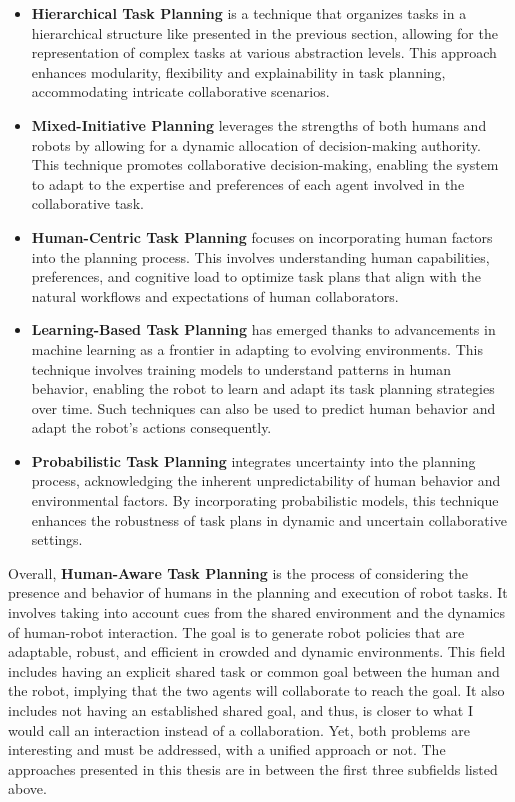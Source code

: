\begin{itemize}
    \item \textbf{Hierarchical Task Planning} is a technique that organizes tasks in a hierarchical structure like presented in the previous section, allowing for the representation of complex tasks at various abstraction levels. This approach enhances modularity, flexibility and explainability in task planning, accommodating intricate collaborative scenarios.
    
    \item \textbf{Mixed-Initiative Planning} leverages the strengths of both humans and robots by allowing for a dynamic allocation of decision-making authority. This technique promotes collaborative decision-making, enabling the system to adapt to the expertise and preferences of each agent involved in the collaborative task.
    
    \item \textbf{Human-Centric Task Planning} focuses on incorporating human factors into the planning process. This involves understanding human capabilities, preferences, and cognitive load to optimize task plans that align with the natural workflows and expectations of human collaborators.
    
    \item \textbf{Learning-Based Task Planning} has emerged thanks to advancements in machine learning as a frontier in adapting to evolving environments. This technique involves training models to understand patterns in human behavior, enabling the robot to learn and adapt its task planning strategies over time. Such techniques can also be used to predict human behavior and adapt the robot's actions consequently.
    
    \item \textbf{Probabilistic Task Planning} integrates uncertainty into the planning process, acknowledging the inherent unpredictability of human behavior and environmental factors. By incorporating probabilistic models, this technique enhances the robustness of task plans in dynamic and uncertain collaborative settings.
\end{itemize}

Overall, \textbf{Human-Aware Task Planning} is the process of considering the presence and behavior of humans in the planning and execution of robot tasks. It involves taking into account cues from the shared environment and the dynamics of human-robot interaction. The goal is to generate robot policies that are adaptable, robust, and efficient in crowded and dynamic environments. This field includes having an explicit shared task or common goal between the human and the robot, implying that the two agents will collaborate to reach the goal. It also includes not having an established shared goal, and thus, is closer to what I would call an interaction instead of a collaboration. Yet, both problems are interesting and must be addressed, with a unified approach or not. 
The approaches presented in this thesis are in between the first three subfields listed above. 


